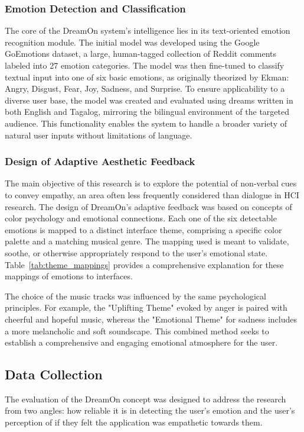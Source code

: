 \documentclass[conference]{IEEEtran}
\begin{document}
	\subsubsection{Emotion Detection and Classification}
	The core of the DreamOn system's intelligence lies in its text-oriented emotion recognition module. The initial model was developed using the Google GoEmotions dataset, a large, human-tagged collection of Reddit comments labeled into 27 emotion categories. The model was then fine-tuned to classify textual input into one of six basic emotions, as originally theorized by Ekman: Angry, Disgust, Fear, Joy, Sadness, and Surprise. To ensure applicability to a diverse user base, the model was created and evaluated using dreams written in both English and Tagalog, mirroring the bilingual environment of the targeted audience. This functionality enables the system to handle a broader variety of natural user inputs without limitations of language.
	
	\subsubsection{Design of Adaptive Aesthetic Feedback}
	The main objective of this research is to explore the potential of non-verbal cues to convey empathy, an area often less frequently considered than dialogue in HCI research. The design of DreamOn's adaptive feedback was based on concepts of color psychology and emotional connections. Each one of the six detectable emotions is mapped to a distinct interface theme, comprising a specific color palette and a matching musical genre. The mapping used is meant to validate, soothe, or otherwise appropriately respond to the user's emotional state. Table~\ref{tab:theme_mappings} provides a comprehensive explanation for these mappings of emotions to interfaces.
	
	The choice of the music tracks was influenced by the same psychological principles. For example, the "Uplifting Theme" evoked by anger is paired with cheerful and hopeful music, whereas the "Emotional Theme" for sadness includes a more melancholic and soft soundscape. This combined method seeks to establish a comprehensive and engaging emotional atmosphere for the user.
	
	
	\subsection{Data Collection}
	The evaluation of the DreamOn concept was designed to address the research from two angles: how reliable it is in detecting the user’s emotion and the user’s perception of if they felt the application was empathetic towards them.
	
\end{document}

